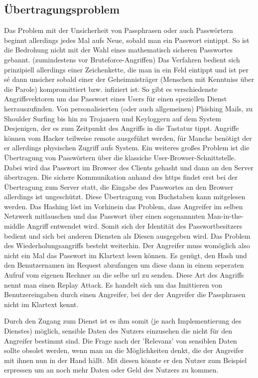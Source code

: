\subsection{Übertragungsproblem}
Das Problem mit der Unsicherheit von Passphrasen oder auch Passwörtern beginnt allerdings jedes Mal aufs Neue, sobald man ein Passwort eintippt. So ist die Bedrohung nicht mit der Wahl eines mathematisch sicheren Passwortes gebannt. (zumindestens vor Bruteforce-Angriffen) Das Verfahren bedient sich prinzipiell allerdings einer Zeichenkette, die man in ein Feld eintippt und ist per sé dann unsicher sobald einer der Geheimnisträger (Menschen mit Kenntniss über die Parole) kompromittiert bzw. infiziert ist. So gibt es verschiedenste Angriffsvektoren um das Passwort eines Users für einen speziellen Dienst herrauszufinden. Von personalisierten (oder auch allgemeinen) Phishing Mails, zu Shoulder Surfing bis hin zu Trojanern und Keyloggern auf dem System Desjenigen, der es zum Zeitpunkt des Angriffs in die Tastatur tippt. Angriffe können vom Hacker teilweise remote ausgeführt werden, für Manche benötigt der er allerdings physischen Zugriff aufs System. Ein weiteres großes Problem ist die Übertragung von Passwörtern über die klassiche User-Browser-Schnittstelle. Dabei wird das Passwort im Browser des Clients gehasht und dann an den Server übertragen. Die sichere Kommunikation anhand des \ac{https} findet erst bei der Übertragung zum Server statt, die Eingabe des Passwortes an den Browser allerdings ist ungeschützt. Diese Übertragung von Buchstaben kann mitgelesen werden. Das Hashing löst im Vorhinein das Problem, dass Angreifer im selben Netzwerk mitlauschen und das Passwort über einen sogenannnten Man-in-the-middle Angriff entwendet wird. Somit sich der Identität des Passwortbesitzers bedient und sich bei anderen Diensten als Diesen ausgegeben wird. Das Problem des Wiederholungsangriffs besteht weiterhin. Der Angreifer muss womöglich also nicht ein Mal das Passwort im Klartext lesen können. Es genügt, den Hash und den Benutzernamen im Request abzufangen um diese dann in einem seperaten Aufruf vom eigenen Rechner an die selbe \ac{url} zu senden. Diese Art des Angriffs nennt man einen Replay Attack. Es handelt sich um das Imittieren von Benutzereingaben durch einen Angreifer, bei der der Angreifer die Passphrasen nicht im Klartext kennt.

Durch den Zugang zum Dienst ist es ihm somit (je nach Implementierung des Dienstes) möglich, sensible Daten des Nutzers einzusehen die nicht für den Angreifer bestimmt sind. Die Frage nach der 'Relevanz' von sensiblen Daten sollte obsolet werden, wenn man an die Möglichkeiten denkt, die der Angreifer mit ihnen nun in der Hand hällt. Mit diesen könnte er den Nutzer zum Beispiel erpressen um an noch mehr Daten oder Geld des Nutzers zu kommen.

